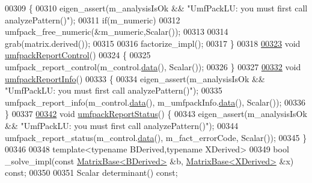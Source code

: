 \begin{DoxyCode}
00309     \{
00310       eigen\_assert(m\_analysisIsOk && \textcolor{stringliteral}{"UmfPackLU: you must first call analyzePattern()"});
00311       \textcolor{keywordflow}{if}(m\_numeric)
00312         umfpack\_free\_numeric(&m\_numeric,Scalar());
00313 
00314       grab(matrix.derived());
00315 
00316       factorize\_impl();
00317     \}
00318 
\hyperlink{class_eigen_1_1_umf_pack_l_u_ac6ff58ef8eb8221e6af87de750d6619b}{00323}     \textcolor{keywordtype}{void} \hyperlink{class_eigen_1_1_umf_pack_l_u_ac6ff58ef8eb8221e6af87de750d6619b}{umfpackReportControl}()
00324     \{
00325       umfpack\_report\_control(m\_control.\hyperlink{class_eigen_1_1_plain_object_base_ac25699535374b1854cf8494e44ad31b2}{data}(), Scalar());
00326     \}
00327 
\hyperlink{class_eigen_1_1_umf_pack_l_u_afad062dfc49ca6d2d19d534b3f8f8d28}{00332}     \textcolor{keywordtype}{void} \hyperlink{class_eigen_1_1_umf_pack_l_u_afad062dfc49ca6d2d19d534b3f8f8d28}{umfpackReportInfo}()
00333     \{
00334       eigen\_assert(m\_analysisIsOk && \textcolor{stringliteral}{"UmfPackLU: you must first call analyzePattern()"});
00335       umfpack\_report\_info(m\_control.\hyperlink{class_eigen_1_1_plain_object_base_ac25699535374b1854cf8494e44ad31b2}{data}(), m\_umfpackInfo.\hyperlink{class_eigen_1_1_plain_object_base_ac25699535374b1854cf8494e44ad31b2}{data}(), Scalar());
00336     \}
00337 
\hyperlink{class_eigen_1_1_umf_pack_l_u_a82497bbf75d995a6d4ae7e9191f79525}{00342}     \textcolor{keywordtype}{void} \hyperlink{class_eigen_1_1_umf_pack_l_u_a82497bbf75d995a6d4ae7e9191f79525}{umfpackReportStatus}() \{
00343       eigen\_assert(m\_analysisIsOk && \textcolor{stringliteral}{"UmfPackLU: you must first call analyzePattern()"});
00344       umfpack\_report\_status(m\_control.\hyperlink{class_eigen_1_1_plain_object_base_ac25699535374b1854cf8494e44ad31b2}{data}(), m\_fact\_errorCode, Scalar());
00345     \}
00346 
00348     \textcolor{keyword}{template}<\textcolor{keyword}{typename} BDerived,\textcolor{keyword}{typename} XDerived>
00349     \textcolor{keywordtype}{bool} \_solve\_impl(\textcolor{keyword}{const} \hyperlink{group___core___module_class_eigen_1_1_matrix_base}{MatrixBase<BDerived>} &b, 
      \hyperlink{group___core___module_class_eigen_1_1_matrix_base}{MatrixBase<XDerived>} &x) \textcolor{keyword}{const};
00350 
00351     Scalar determinant() \textcolor{keyword}{const};

\end{DoxyCode}
